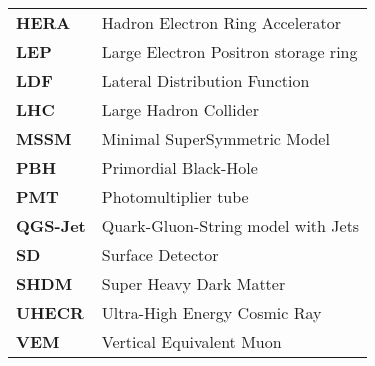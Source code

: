 \begin{tabular}{ll}
\textbf{HERA} & \hspace{1cm}Hadron Electron Ring Accelerator\\
\textbf{LEP}&\hspace{1cm}Large Electron Positron storage ring\\
\textbf{LDF} & \hspace{1cm}Lateral Distribution Function \\
\textbf{LHC} & \hspace{1cm}Large Hadron Collider\\
\textbf{MSSM} &\hspace{1cm}Minimal SuperSymmetric Model\\
\textbf{PBH} & \hspace{1cm}Primordial Black-Hole\\
\textbf{PMT} & \hspace{1cm}Photomultiplier tube \\
\textbf{QGS-Jet} & \hspace{1cm}Quark-Gluon-String model with Jets\\
\textbf{SD} & \hspace{1cm}Surface Detector\\
\textbf{SHDM} & \hspace{1cm}Super Heavy Dark Matter\\
\textbf{UHECR} & \hspace{1cm}Ultra-High Energy Cosmic Ray\\
\textbf{VEM} & \hspace{1cm}Vertical Equivalent Muon \\

  \end{tabular}


